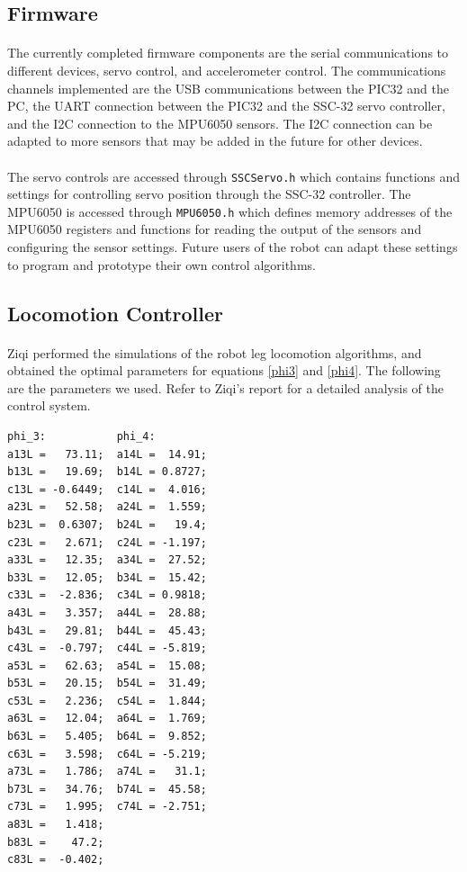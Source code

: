 \documentclass[titlepage,letterpaper,12pt]{article}
\begin{document}
\subsection{Firmware}
\paragraph{}The currently completed firmware components are the serial
communications to different devices, servo control, and accelerometer control.
The communications channels implemented are the USB communications between the
PIC32 and the PC, the UART connection between the PIC32 and the SSC-32 servo
controller, and the I2C connection to the MPU6050 sensors. The I2C connection
can be adapted to more sensors that may be added in the future for other
devices. 

\paragraph{}The servo controls are accessed through \verb!SSCServo.h! which
contains functions and settings for controlling servo position through the
SSC-32 controller. The MPU6050 is accessed through \verb!MPU6050.h! which
defines memory addresses of the MPU6050 registers and functions for reading the
output of the sensors and configuring the sensor settings. Future users of the
robot can adapt these settings to program and prototype their own control
algorithms.

\subsection{Locomotion Controller}
\paragraph{}Ziqi performed the simulations of the robot leg locomotion
algorithms, and obtained the optimal parameters for equations \ref{phi3} and
\ref{phi4}. The following are the parameters we used. Refer to Ziqi's report for
a detailed analysis of the control system.
\begin{verbatim}
phi_3:           phi_4:
a13L =   73.11;  a14L =  14.91;
b13L =   19.69;  b14L = 0.8727;
c13L = -0.6449;  c14L =  4.016;
a23L =   52.58;  a24L =  1.559;
b23L =  0.6307;  b24L =   19.4;
c23L =   2.671;  c24L = -1.197;
a33L =   12.35;  a34L =  27.52;
b33L =   12.05;  b34L =  15.42;
c33L =  -2.836;  c34L = 0.9818;
a43L =   3.357;  a44L =  28.88;
b43L =   29.81;  b44L =  45.43;
c43L =  -0.797;  c44L = -5.819;
a53L =   62.63;  a54L =  15.08;
b53L =   20.15;  b54L =  31.49;
c53L =   2.236;  c54L =  1.844;
a63L =   12.04;  a64L =  1.769;
b63L =   5.405;  b64L =  9.852;
c63L =   3.598;  c64L = -5.219;
a73L =   1.786;  a74L =   31.1;
b73L =   34.76;  b74L =  45.58;
c73L =   1.995;  c74L = -2.751;
a83L =   1.418;
b83L =    47.2;
c83L =  -0.402;
\end{verbatim}
\end{document}
